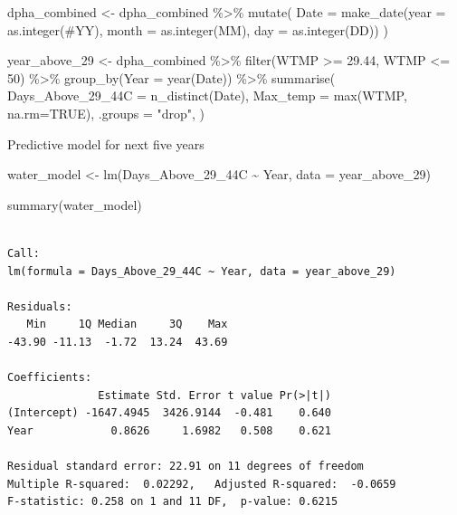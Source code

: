 \documentclass[
  letterpaper,
  DIV=11,
  numbers=noendperiod]{scrreprt}
\newenvironment{Shaded}{\begin{snugshade}}{\end{snugshade}}
\newcommand{\AttributeTok}[1]{\textcolor[rgb]{0.40,0.45,0.13}{#1}}
\newcommand{\ConstantTok}[1]{\textcolor[rgb]{0.56,0.35,0.01}{#1}}
\newcommand{\DecValTok}[1]{\textcolor[rgb]{0.68,0.00,0.00}{#1}}
\newcommand{\FloatTok}[1]{\textcolor[rgb]{0.68,0.00,0.00}{#1}}
\newcommand{\FunctionTok}[1]{\textcolor[rgb]{0.28,0.35,0.67}{#1}}
\newcommand{\NormalTok}[1]{\textcolor[rgb]{0.00,0.23,0.31}{#1}}
\newcommand{\OtherTok}[1]{\textcolor[rgb]{0.00,0.23,0.31}{#1}}
\newcommand{\SpecialCharTok}[1]{\textcolor[rgb]{0.37,0.37,0.37}{#1}}
\newcommand{\StringTok}[1]{\textcolor[rgb]{0.13,0.47,0.30}{#1}}
\begin{document}
\begin{Shaded}
\begin{Highlighting}[]
\NormalTok{dpha\_combined }\OtherTok{\textless{}{-}}\NormalTok{ dpha\_combined }\SpecialCharTok{\%\textgreater{}\%}
  \FunctionTok{mutate}\NormalTok{(}
    \AttributeTok{Date =} \FunctionTok{make\_date}\NormalTok{(}\AttributeTok{year =} \FunctionTok{as.integer}\NormalTok{(}\StringTok{\textasciigrave{}}\AttributeTok{\#YY}\StringTok{\textasciigrave{}}\NormalTok{), }\AttributeTok{month =} \FunctionTok{as.integer}\NormalTok{(MM), }\AttributeTok{day =} \FunctionTok{as.integer}\NormalTok{(DD))}
\NormalTok{  )}

\NormalTok{year\_above\_29 }\OtherTok{\textless{}{-}}\NormalTok{ dpha\_combined }\SpecialCharTok{\%\textgreater{}\%}
  \FunctionTok{filter}\NormalTok{(WTMP }\SpecialCharTok{\textgreater{}=} \FloatTok{29.44}\NormalTok{, WTMP }\SpecialCharTok{\textless{}=} \DecValTok{50}\NormalTok{) }\SpecialCharTok{\%\textgreater{}\%}
  \FunctionTok{group\_by}\NormalTok{(}\AttributeTok{Year =} \FunctionTok{year}\NormalTok{(Date)) }\SpecialCharTok{\%\textgreater{}\%}
  \FunctionTok{summarise}\NormalTok{(}
    \AttributeTok{Days\_Above\_29\_44C =} \FunctionTok{n\_distinct}\NormalTok{(Date), }
    \AttributeTok{Max\_temp =} \FunctionTok{max}\NormalTok{(WTMP, }\AttributeTok{na.rm=}\ConstantTok{TRUE}\NormalTok{),}
    \AttributeTok{.groups =} \StringTok{"drop"}\NormalTok{,}
\NormalTok{    )}
\end{Highlighting}
\end{Shaded}

Predictive model for next five years

\begin{Shaded}
\begin{Highlighting}[]
\NormalTok{water\_model }\OtherTok{\textless{}{-}} \FunctionTok{lm}\NormalTok{(Days\_Above\_29\_44C }\SpecialCharTok{\textasciitilde{}}\NormalTok{ Year, }\AttributeTok{data =}\NormalTok{ year\_above\_29)}

\FunctionTok{summary}\NormalTok{(water\_model)  }
\end{Highlighting}
\end{Shaded}

\begin{verbatim}

Call:
lm(formula = Days_Above_29_44C ~ Year, data = year_above_29)

Residuals:
   Min     1Q Median     3Q    Max 
-43.90 -11.13  -1.72  13.24  43.69 

Coefficients:
              Estimate Std. Error t value Pr(>|t|)
(Intercept) -1647.4945  3426.9144  -0.481    0.640
Year            0.8626     1.6982   0.508    0.621

Residual standard error: 22.91 on 11 degrees of freedom
Multiple R-squared:  0.02292,   Adjusted R-squared:  -0.0659 
F-statistic: 0.258 on 1 and 11 DF,  p-value: 0.6215
\end{verbatim}
\end{document}
